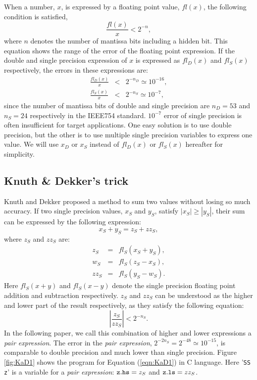 When a number, $x$, is expressed by a floating point value, $fl(x)$,
the following condition is satisfied,
\begin{equation}
\frac{fl(x)}{x}<2^{-n},
\end{equation}
where $n$ denotes the number of mantissa bits including a hidden bit.
This equation shows the range of the error of the floating point 
expression.
If the double and single precision expression of $x$ 
is expressed as $fl_D(x)$ and $fl_S(x)$ respectively, the errors in 
these expressions are:
\begin{eqnarray}
\frac{fl_D(x)}{x} &<& 2^{-n_D}\simeq 10^{-16},\\
\frac{fl_S(x)}{x} &<& 2^{-n_S}\simeq 10^{-7},
\end{eqnarray}
since the number of mantissa bits of double and single precision
are $n_D=53$ and $n_S=24$ respectively in the IEEE754 standard.
$10^{-7}$ error of single precision is often insufficient for 
target applications. One easy solution is to use double precision, 
but the other is to use multiple single precision variables to express 
one value. We will use $x_D$ or $x_S$ 
instead of $fl_D(x)$ or $fl_S(x)$ hereafter for simplicity.

\subsection{Knuth \& Dekker's trick}

Knuth \cite{Knuth} and Dekker \cite{Dekker}
proposed a method to sum two values without
losing so much accuracy. If two single precision values, 
$x_S$ and $y_S$, satisfy $|x_S|\geq |y_S|$, their sum 
can be expressed by the following expression:
\begin{equation}
x_S + y_S = z_S + zz_S,
\end{equation}
where $z_S$ and $zz_S$ are:
\begin{eqnarray}
z_S &=& fl_S(x_S + y_S),\nonumber \\
w_S &=& fl_S(z_S - x_S),\label{eqn:KaD1}\\
zz_S &=& fl_S( y_S - w_S).\nonumber
\end{eqnarray}
Here $fl_S(x+y)$ and $fl_S(x-y)$ denote the single precision floating point 
addition and subtraction respectively.
$z_S$ and $zz_S$ can be understood as the higher and lower part
of the result respectively, as they satisfy the following equation:
\begin{equation}
|\frac{z_S}{zz_S}|<2^{-n_S}.
\end{equation}
In the following paper, we call this combination of 
higher and lower expressions a {\it pair expression}.
The error in the {\it pair expression}, $2^{-2 n_S}=2^{-48}\simeq 10^{-15}$,
is comparable to double precision and much lower than single precision.
Figure \ref{fig:KaD1} shows the program for Equation (\ref{eqn:KaD1})
in C language. Here '{\tt SS z}' is a variable for a {\it pair 
expression}: ${\tt z.hs}=z_S$ and ${\tt z.ls}=zz_S$.

